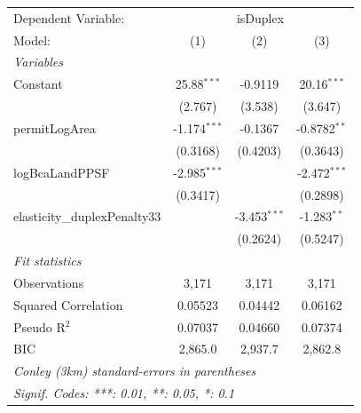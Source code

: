 
\begingroup
\centering
\begin{tabular}{lccc}
   \tabularnewline \midrule \midrule
   Dependent Variable: & \multicolumn{3}{c}{isDuplex}\\
   Model:                       & (1)            & (2)            & (3)\\  
   \midrule
   \emph{Variables}\\
   Constant                     & 25.88$^{***}$  & -0.9119        & 20.16$^{***}$\\   
                                & (2.767)        & (3.538)        & (3.647)\\   
   permitLogArea                & -1.174$^{***}$ & -0.1367        & -0.8782$^{**}$\\   
                                & (0.3168)       & (0.4203)       & (0.3643)\\   
   logBcaLandPPSF               & -2.985$^{***}$ &                & -2.472$^{***}$\\   
                                & (0.3417)       &                & (0.2898)\\   
   elasticity\_duplexPenalty33  &                & -3.453$^{***}$ & -1.283$^{**}$\\   
                                &                & (0.2624)       & (0.5247)\\   
   \midrule
   \emph{Fit statistics}\\
   Observations                 & 3,171          & 3,171          & 3,171\\  
   Squared Correlation          & 0.05523        & 0.04442        & 0.06162\\  
   Pseudo R$^2$                 & 0.07037        & 0.04660        & 0.07374\\  
   BIC                          & 2,865.0        & 2,937.7        & 2,862.8\\  
   \midrule \midrule
   \multicolumn{4}{l}{\emph{Conley (3km) standard-errors in parentheses}}\\
   \multicolumn{4}{l}{\emph{Signif. Codes: ***: 0.01, **: 0.05, *: 0.1}}\\
\end{tabular}
\par\endgroup


